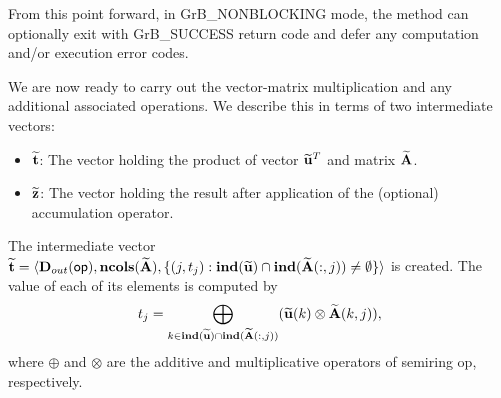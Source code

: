 From this point forward, in {\sf GrB\_NONBLOCKING} mode, the method can 
optionally exit with {\sf GrB\_SUCCESS} return code and defer any computation 
and/or execution error codes.

We are now ready to carry out the vector-matrix multiplication and any additional 
associated operations.  We describe this in terms of two intermediate vectors:
\begin{itemize}
    \item ${\bf \widetilde{t}}$: The vector holding the product of vector
    ${\bf \widetilde{u}}^T$ and matrix ${\bf \widetilde{A}}$.
    \item ${\bf \widetilde{z}}$: The vector holding the result after 
    application of the (optional) accumulation operator.
\end{itemize}

The intermediate vector ${\bf \widetilde{t}} = \langle
\mbox{$\mathbf{D}_{out}$}({\sf op}), \bold{ncols}({\bf \widetilde{A}}),
\{(j,t_j) : \bold{ind}({\bf \widetilde{u}}) \cap
\bold{ind}({\bf \widetilde{A}}(:,j)) \neq \emptyset \} \rangle$
is created.  The value of each of its elements is computed by 
\[t_j = \bigoplus_{k \in \bold{ind}({\bf \widetilde{u}}) \cap
\bold{ind}({\bf \widetilde{A}}(:,j))} ({\bf \widetilde{u}}(k)
\otimes {\bf \widetilde{A}}(k,j)),\] where $\oplus$ and $\otimes$
are the additive and multiplicative operators of semiring {\sf op},
respectively.




